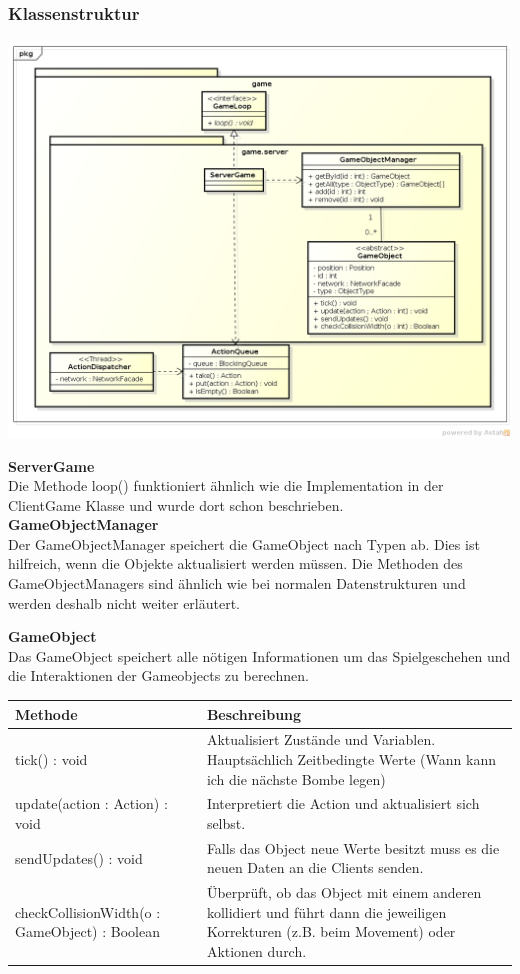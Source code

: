 \documentclass[11pt]{scrartcl}
\begin{document}
\subsubsection{Klassenstruktur}
\includegraphics[scale=0.5]{ClassDiagramGameServer}

\textbf{ServerGame}\\
Die Methode loop() funktioniert ähnlich wie die Implementation in der ClientGame Klasse und wurde dort schon beschrieben.\\

\textbf{GameObjectManager}\\
Der GameObjectManager speichert die GameObject nach Typen ab. Dies ist hilfreich, wenn die Objekte aktualisiert werden müssen. Die Methoden des GameObjectManagers sind ähnlich wie bei normalen Datenstrukturen und werden deshalb nicht weiter erläutert.\\

\newpage

\textbf{GameObject}\\
Das GameObject speichert alle nötigen Informationen um das Spielgeschehen und die Interaktionen der Gameobjects zu berechnen.\\


\begin{tabularx}{\linewidth}{l p{6cm}}
\textbf{Methode} & \textbf{Beschreibung}\\
\hline
tick() : void & Aktualisiert Zustände und Variablen. Hauptsächlich Zeitbedingte Werte (Wann kann ich die nächste Bombe legen)\\
update(action : Action) : void & Interpretiert die Action und aktualisiert sich selbst.\\
sendUpdates() : void & Falls das Object neue Werte besitzt muss es die neuen Daten an die Clients senden.\\
checkCollisionWidth(o : GameObject) : Boolean & Überprüft, ob das Object mit einem anderen kollidiert und führt dann die jeweiligen Korrekturen (z.B. beim Movement) oder Aktionen durch.\\

\end{tabularx}
\end{document}
